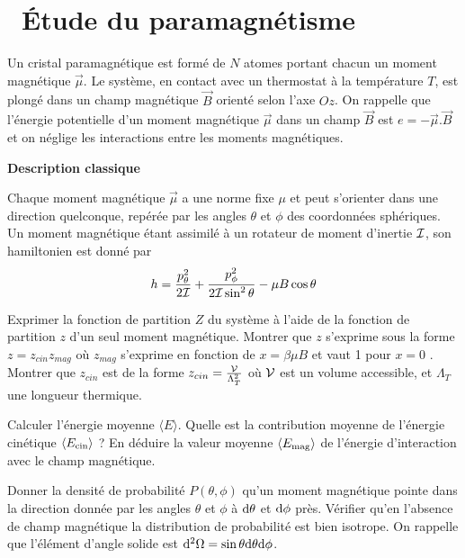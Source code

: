 \documentclass[utf8, 11pt]{feuille}
\begin{document}




\section{\soft~Étude du paramagnétisme}

Un cristal paramagnétique est formé de $N$ atomes portant chacun un moment magnétique $\overrightarrow{\mu}$. Le système, en contact avec un thermostat à la température $T$, est plongé dans un champ magnétique $\overrightarrow{B}$ orienté selon l'axe $Oz$.  On rappelle que l'énergie potentielle d'un moment magnétique $\overrightarrow{\mu}$ dans un champ $\overrightarrow{B}$ est $e=-\overrightarrow{\mu}.\overrightarrow{B}$ et on néglige les interactions entre les moments magnétiques.

\medskip

{\sffamily\bfseries{Description classique}}

Chaque moment magnétique $\overrightarrow{\mu}$ a une norme fixe $\mu$ et peut s'orienter dans une direction quelconque, repérée par les angles $\theta$ et $\phi$ des coordonnées sphériques. Un moment magnétique étant assimilé à un rotateur de moment d'inertie $\cal I$, son hamiltonien est donné par
$$
h=\frac{p_{\theta}^2}{2 {\cal I}} + \frac{p_{\phi}^2}{2 {\cal I}\sin^{2} \theta} -\mu B \cos \theta
$$

\question
Exprimer la fonction de partition $Z$ du système à l'aide de la fonction de partition $z$ d'un seul moment magnétique. Montrer que $z$ s'exprime sous la forme $z=z_{cin}z_{mag}$ où $z_{mag}$ s'exprime en fonction de $x=\beta \mu B$ et vaut 1 pour $x=0$ . Montrer que $z_{cin}$ est de la forme $z_{cin}=\frac{\cal V}{\Lambda_T^2}$ où $\cal V$ est un \og volume accessible\fg, et $\Lambda_T$ une longueur  thermique.

\question
Calculer l'énergie moyenne $\langle E \rangle$. Quelle est la contribution moyenne de l'énergie cinétique $\langle E_{\rm cin} \rangle$ ? En déduire la valeur moyenne $\langle E_{\rm mag}\rangle $ de l'énergie d'interaction avec le champ magnétique.

\question
Donner la densité de probabilité $P(\theta, \phi)$ qu'un moment magnétique pointe dans la direction donnée par les angles $\theta$ et $\phi$ à ${\rm d}\theta$ et ${\rm d}\phi$ près. Vérifier qu'en l'absence de champ magnétique la distribution de probabilité est bien isotrope. On rappelle que l'élément d'angle solide est ${\rm d}^2 \Omega= \sin \theta {\rm d} \theta {\rm d} \phi$.
\end{document}
